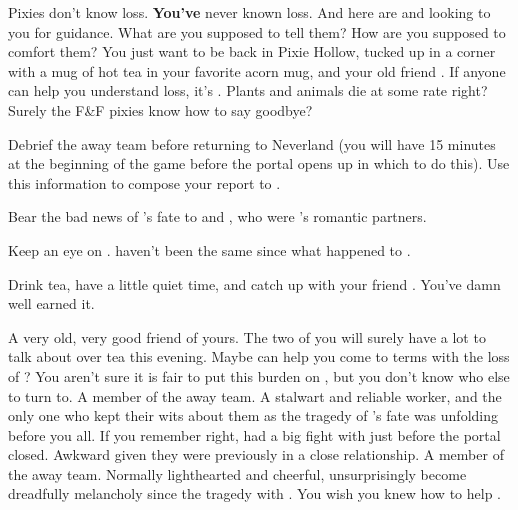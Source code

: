 \documentclass[char]{PP}
\begin{document}
Pixies don't know loss. \textbf{You've} never known loss. And here are \cELove{} and \cMChange{} looking to you for guidance. What are you supposed to tell them? How are you supposed to comfort them? You just want to be back in Pixie Hollow, tucked up in a corner with a mug of hot tea in your favorite acorn mug, and your old friend \cFHead{}. If anyone can help you understand loss, it's \cFHead{}. Plants and animals die at some rate right? Surely the F\&F pixies know how to say goodbye?

\begin{itemz}
	\item Debrief the away team before returning to Neverland (you will have 15 minutes at the beginning of the game before the portal opens up in which to do this). Use this information to compose your report to \cSHead{}.
	\item Bear the bad news of \cFLost{}'s fate to \cFButterfly{} and \cMHead{}, who were \cFLost{}'s romantic partners.
	\item Keep an eye on \cMChange{}. \cMChange{\They} haven't been the same since what happened to \cFLost{}.
	\item Drink tea, have a little quiet time, and catch up with your friend \cFHead{}. You've damn well earned it.
\end{itemz}

\begin{itemz}[Notes]
	\item 
\end{itemz}

\begin{contacts}
	\contact{\cFHead{}} A very old, very good friend of yours. The two of you will surely have a lot to talk about over tea this evening. Maybe \cFHead{} can help you come to terms with the loss of \cFLost{}? You aren't sure it is fair to put this burden on \cFHead{}, but you don't know who else to turn to.
	\contact{\cELove{}} A member of the away team. A stalwart and reliable worker, and the only one who kept their wits about them as the tragedy of \cFLost{}'s fate was unfolding before you all. If you remember right, \cELove{} had a big fight with \cEHead{} just before the portal closed. Awkward given they were previously in a close relationship.
	\contact{\cMChange{}} A member of the away team. Normally lighthearted and cheerful, \cMChange{\They} \cMChange{\have} unsurprisingly become dreadfully melancholy since the tragedy with \cFLost{}. You wish you knew how to help \cMChange{\them}.
\end{contacts}
\end{document}
